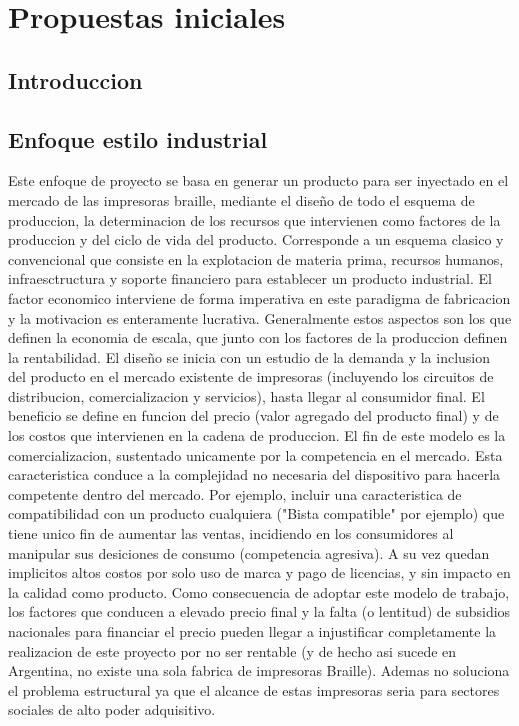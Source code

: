 \chapter{Propuestas iniciales}
\section{Introduccion} 
\section {Enfoque estilo industrial}
Este enfoque de proyecto se basa en generar un producto para ser inyectado en
el mercado de las impresoras braille, mediante el diseño de todo el esquema de
produccion, la determinacion de los recursos que intervienen como factores de
la produccion y del ciclo de vida del producto. Corresponde a un esquema clasico
y convencional que consiste en la explotacion de materia prima, recursos
humanos, infraesctructura y soporte financiero para establecer un producto
industrial. El factor economico interviene de forma imperativa en este
paradigma de fabricacion y la motivacion es enteramente lucrativa. 
Generalmente estos aspectos son los que definen la economia de escala, que
junto con los factores de la produccion definen la rentabilidad.
El diseño se inicia con un estudio de la demanda y la inclusion del producto en
el mercado existente de impresoras (incluyendo los circuitos de distribucion, 
comercializacion y servicios), hasta llegar al consumidor final.
El beneficio se define en funcion del precio (valor agregado del producto
final) y de los costos que intervienen en la cadena de produccion. 
El fin de este modelo es la comercializacion, sustentado unicamente por la
competencia en el mercado. 
Esta caracteristica conduce a la complejidad no necesaria del dispositivo para
hacerla competente dentro del mercado. Por ejemplo, incluir una caracteristica
de compatibilidad con un producto cualquiera ("Bista compatible" por ejemplo) 
que tiene unico fin de aumentar las ventas, incidiendo en los consumidores al
manipular sus desiciones de consumo (competencia agresiva).
A su vez quedan implicitos altos costos por solo uso de marca y pago de 
licencias, y sin impacto en la calidad como producto.
Como consecuencia de adoptar este modelo de trabajo, los factores que conducen
a elevado precio final y la falta (o lentitud) de subsidios nacionales
para financiar el precio pueden llegar a injustificar completamente la 
realizacion de este proyecto por no ser rentable (y de hecho asi sucede en
Argentina, no existe una sola fabrica de impresoras Braille).
Ademas no soluciona el problema estructural ya que el alcance de estas
impresoras seria para sectores sociales de alto poder adquisitivo.
